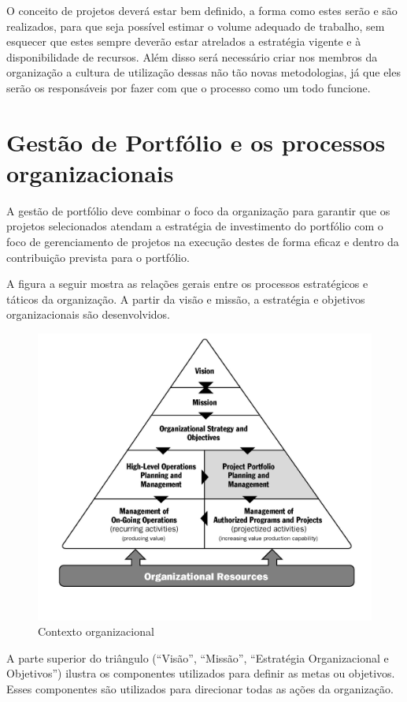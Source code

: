 \documentclass[12pt,a4paper,ruledheader,tocpage=prefix,floatnumber=continuous,pagestart=folhaderosto,font=times]{abnt}
\begin{document}
O conceito de projetos deverá estar bem definido, a forma como estes serão e são realizados, para que seja possível estimar o volume adequado de trabalho,
sem esquecer que estes sempre deverão estar atrelados a estratégia vigente e à disponibilidade de recursos. Além disso será necessário criar nos membros 
da organização a cultura de utilização dessas não tão novas metodologias, já que eles serão os responsáveis por fazer com que o processo como um todo 
funcione.

\section{Gestão de Portfólio e os processos organizacionais}
A gestão de portfólio deve combinar o foco da organização para garantir que os projetos selecionados atendam a estratégia de investimento do 
portfólio com o foco de gerenciamento de projetos na execução destes de forma eficaz e dentro da contribuição prevista para o portfólio.

A figura a seguir mostra as relações gerais entre os processos estratégicos e táticos da organização. A partir da visão e missão, a estratégia e 
objetivos organizacionais são desenvolvidos.

\begin{figure}[H]
\centering
\includegraphics[width=.9\textwidth]{organizacional_port.jpg}
\caption{Contexto organizacional}
\end{figure}

A parte superior do triângulo (``Visão'', ``Missão'', ``Estratégia Organizacional e Objetivos'') ilustra os componentes utilizados para definir  as metas 
ou objetivos. Esses componentes são utilizados para direcionar todas as ações da organização. 
\end{document}
